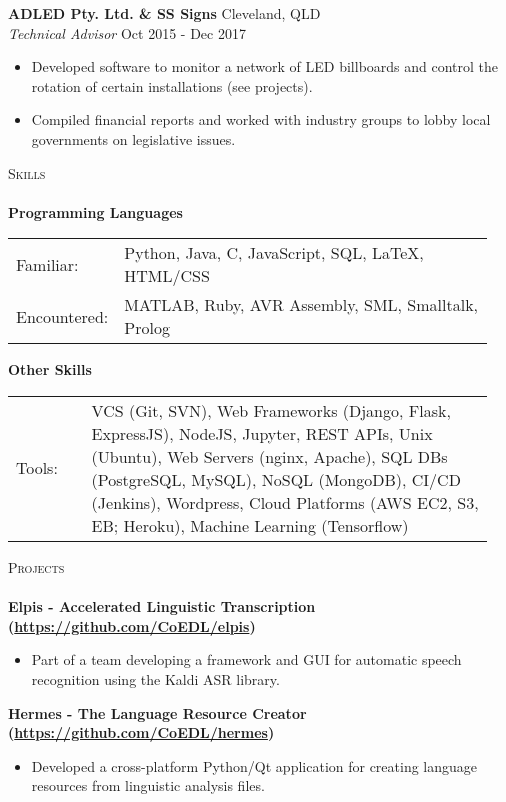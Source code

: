 \documentclass[a4paper]{article}
\newcommand{\lineunder} {
    \vspace*{-8pt} \\
    \hspace*{-10pt} \hrulefill \\
}
\newcommand{\header} [1] {
    {\hspace*{-10pt}\vspace*{6pt} \textsc{#1}}
    \vspace*{-6pt} \lineunder
}
\newenvironment{myitemize}
{   \small
    \vspace{-2pt}
    \begin{itemize}
    \setlength{\itemsep}{0pt}
    \setlength{\parskip}{0pt}
    \setlength{\parsep}{0pt}     }
{ \end{itemize}                  }
\newenvironment{singleitem}
{   \small
    \vspace{-2.6pt}
    \begin{itemize}
    \setlength{\itemsep}{0pt}
    \setlength{\parskip}{0pt}
    \setlength{\parsep}{0pt}   }
{\end{itemize} \vspace{-2.6pt}	}
\begin{document}
\vspace{-1mm}
\textbf{ADLED Pty. Ltd. \& SS Signs} \hfill Cleveland, QLD\\
\textit{Technical Advisor} \hfill Oct 2015 - Dec 2017\\
\vspace{-0.5mm}
\begin{myitemize} \itemsep 0.5mm
	\item Developed software to monitor a network of LED billboards and control the rotation of certain installations (see projects).
	\item Compiled financial reports and worked with industry groups to lobby local governments on legislative issues.
\end{myitemize}

\vspace{-2mm}
\header{Skills}
\textbf{Programming Languages}
\begin{tabular}{p{0.15\linewidth}p{0.80\linewidth}}
	\small Familiar: & \small Python, Java, C, JavaScript, SQL, \LaTeX, HTML/CSS \\
	\small Encountered: & \small MATLAB, Ruby, AVR Assembly, SML, Smalltalk, Prolog\\
\end{tabular}
\textbf{Other Skills}
\begin{tabular}{p{0.15\linewidth}p{0.80\linewidth}}
	\small Tools: & \small VCS (Git, SVN), Web Frameworks (Django, Flask, ExpressJS), NodeJS,  Jupyter, REST APIs, Unix (Ubuntu), Web Servers (nginx, Apache), SQL DBs (PostgreSQL, MySQL), NoSQL (MongoDB), CI/CD (Jenkins), Wordpress, Cloud Platforms (AWS EC2, S3, EB; Heroku), Machine Learning (Tensorflow)
\end{tabular}

\vspace{0mm}

\header{Projects}

\textbf{{Elpis - Accelerated Linguistic Transcription} (\href{https://github.com/CoEDL/elpis}{https://github.com/CoEDL/elpis})}
\begin{singleitem}
	\item Part of a team developing a framework and GUI for automatic speech recognition using the Kaldi ASR library.
\end{singleitem}

\textbf{{Hermes - The Language Resource Creator} (\href{https://github.com/CoEDL/hermes}{https://github.com/CoEDL/hermes})}
\begin{singleitem}
	\item Developed a cross-platform Python/Qt application for creating language resources from linguistic analysis files.
\end{singleitem}
\end{document}
